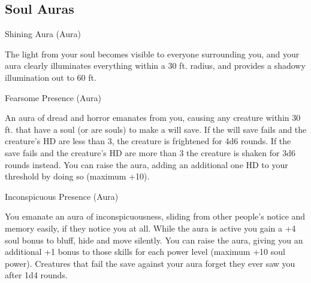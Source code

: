 \subsection{Soul Auras}

\begin{soulpower}{Shining Aura (Aura)}
  \components{-}
  \rangepersonal

  The light from your soul becomes visible to everyone surrounding you, and
  your aura clearly illuminates everything within a 30 ft. radius, and
  provides a shadowy illumination out to 60 ft.
\end{soulpower}

\begin{soulpower}{Fearsome Presence (Aura)}
  \components{-}

  An aura of dread and horror emanates from you, causing any creature within
  30 ft. that have a soul (or are souls) to make a will save. If the will save
  fails and the creature's HD are less than 3, the creature is frightened for
  4d6 rounds. If the save fails and the creature's HD are more than 3 the
  creature is shaken for 3d6 rounds instead. You can raise the aura, adding an
  additional one HD to your threshold by doing so (maximum +10).
\end{soulpower}

\begin{soulpower}{Inconspicuous Presence (Aura)}

  \components{-}
  \rangepersonal

  You emanate an aura of inconspicuousness, sliding from other people's notice
  and memory easily, if they notice you at all. While the aura is active you
  gain a +4 soul bonus to bluff, hide and move silently. You can raise the
  aura, giving you an additional +1 bonus to those skills for each power level
  (maximum +10 soul power). Creatures that fail the save against your aura
  forget they ever saw you after 1d4 rounds.
\end{soulpower}
